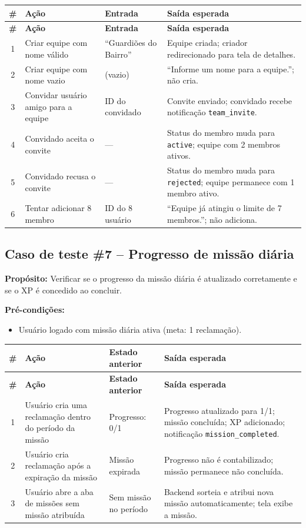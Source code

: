 \begin{longtable}{|c|p{4cm}|p{2.5cm}|p{5cm}|}
  \hline
  \textbf{\#} & \textbf{Ação} & \textbf{Entrada} & \textbf{Saída esperada} \\
  \hline
  \endfirsthead
  \hline
  \textbf{\#} & \textbf{Ação} & \textbf{Entrada} & \textbf{Saída esperada} \\
  \hline
  \endhead
  1 & Criar equipe com nome válido & ``Guardiões do Bairro'' & Equipe criada; criador redirecionado para tela de detalhes. \\
  \hline
  2 & Criar equipe com nome vazio & (vazio) & ``Informe um nome para a equipe.''; não cria. \\
  \hline
  3 & Convidar usuário amigo para a equipe & ID do convidado & Convite enviado; convidado recebe notificação \texttt{team\_invite}. \\
  \hline
  4 & Convidado aceita o convite & — & Status do membro muda para \texttt{active}; equipe com 2 membros ativos. \\
  \hline
  5 & Convidado recusa o convite & — & Status do membro muda para \texttt{rejected}; equipe permanece com 1 membro ativo. \\
  \hline
  6 & Tentar adicionar 8\textordmasculine{} membro & ID do 8\textordmasculine{} usuário & ``Equipe já atingiu o limite de 7 membros.''; não adiciona. \\
  \hline
\end{longtable}

\subsection*{Caso de teste \#7 – Progresso de missão diária}

\textbf{Propósito:} Verificar se o progresso da missão diária é atualizado corretamente e se o XP é concedido ao concluir.

\textbf{Pré-condições:}
\begin{itemize}
  \item Usuário logado com missão diária ativa (meta: 1 reclamação).
\end{itemize}

\begin{longtable}{|c|p{4.5cm}|p{3cm}|p{4cm}|}
  \hline
  \textbf{\#} & \textbf{Ação} & \textbf{Estado anterior} & \textbf{Saída esperada} \\
  \hline
  \endfirsthead
  \hline
  \textbf{\#} & \textbf{Ação} & \textbf{Estado anterior} & \textbf{Saída esperada} \\
  \hline
  \endhead
  1 & Usuário cria uma reclamação dentro do período da missão & Progresso: 0/1 & Progresso atualizado para 1/1; missão concluída; XP adicionado; notificação \texttt{mission\_completed}. \\
  \hline
  2 & Usuário cria reclamação após a expiração da missão & Missão expirada & Progresso não é contabilizado; missão permanece não concluída. \\
  \hline
  3 & Usuário abre a aba de missões sem missão atribuída & Sem missão no período & Backend sorteia e atribui nova missão automaticamente; tela exibe a missão. \\
  \hline
\end{longtable}


